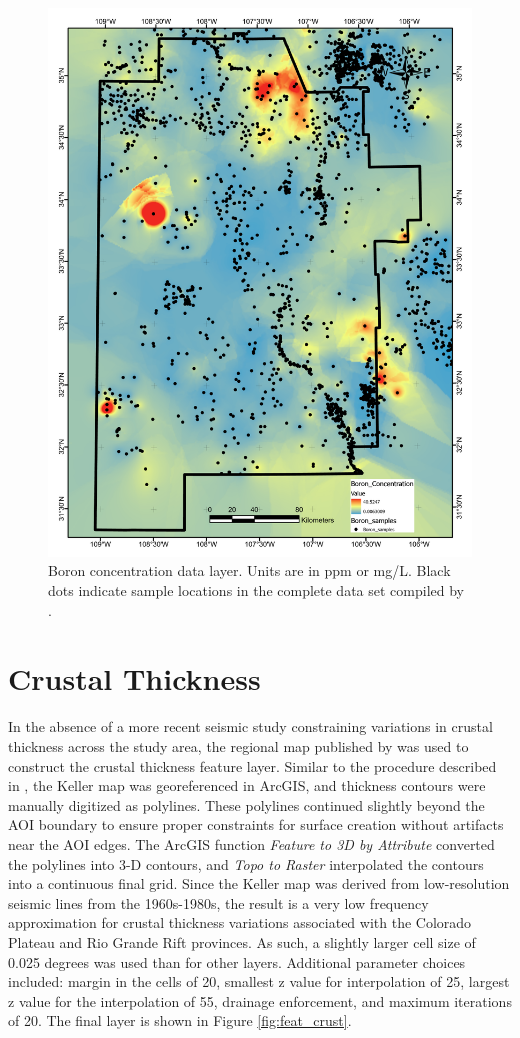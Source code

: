 \begin{figure}[H]
\centering
\includegraphics[width=0.75\linewidth]{templates/images/Figure-Boron.pdf}
\caption[Boron concentration data layer]{Boron concentration data layer. Units are in ppm or mg/L. Black dots indicate sample locations in the complete data set compiled by \protect\citet{bielicki_hydrogeolgic_2015}.}
\label{fig:feat_boron}
\end{figure}
\pagebreak

\section{Crustal Thickness}\label{app:dl_crustal_thickness}
In the absence of a more recent seismic study constraining variations in crustal thickness across the study area, the regional map published by \citet{keller_comparative_1991} was used to construct the crustal thickness feature layer. Similar to the procedure described in \citep{pepin_new_2019}, the Keller map was georeferenced in ArcGIS, and thickness contours were manually digitized as polylines. These polylines continued slightly beyond the AOI boundary to ensure proper constraints for surface creation without artifacts near the AOI edges. The ArcGIS function \textit{Feature to 3D by Attribute} converted the polylines into 3-D contours, and \textit{Topo to Raster} interpolated the contours into a continuous final grid. Since the Keller map was derived from low-resolution seismic lines from the 1960s-1980s, the result is a very low frequency approximation for crustal thickness variations associated with the Colorado Plateau and Rio Grande Rift provinces. As such, a slightly larger cell size of 0.025 degrees was used than for other layers. Additional parameter choices included: margin in the cells of 20, smallest z value for interpolation of 25, largest z value for the interpolation of 55, drainage enforcement, and maximum iterations of 20. The final layer is shown in Figure \ref{fig:feat_crust}.
\vfill
\pagebreak

